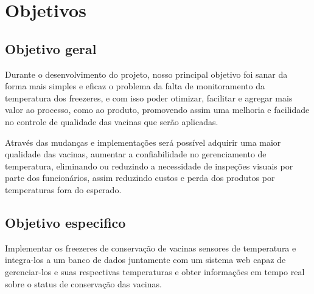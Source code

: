 \chapter{Objetivos}

    \section{Objetivo geral}

    Durante o desenvolvimento do projeto, 
    nosso principal objetivo
    foi sanar da forma mais simples e eficaz 
    o problema da falta de monitoramento da 
    temperatura dos freezeres, e com isso poder 
    otimizar, facilitar e agregar mais valor 
    ao processo, como ao produto, 
    promovendo assim uma melhoria e facilidade 
    no controle de qualidade das vacinas que serão
    aplicadas.

    Através das mudanças e implementações 
    será possível adquirir uma maior qualidade das 
    vacinas, aumentar a confiabilidade no 
    gerenciamento de temperatura, eliminando
    ou reduzindo a necessidade de inspeções visuais 
    por parte dos funcionários, assim reduzindo 
    custos e perda dos produtos por temperaturas
    fora do esperado.


    \section{Objetivo especifico}
    Implementar os freezeres de conservação de vacinas 
    sensores de temperatura e integra-los a um banco de 
    dados juntamente com um sistema web capaz de gerenciar-los
    e suas respectivas temperaturas e 
    obter informações em tempo real sobre o status 
    de conservação das vacinas.
